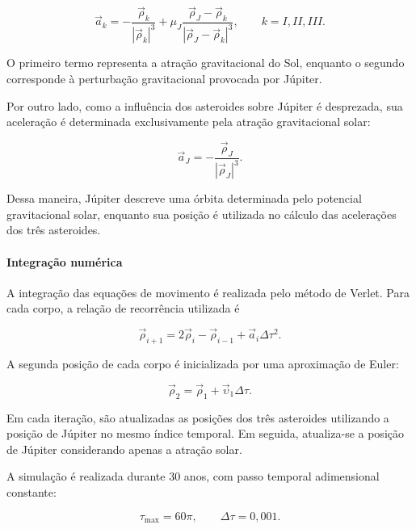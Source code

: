 \documentclass[12pt,a4paper]{article}
\begin{document}
\begin{equation}
    \vec{a}_k=
    -\frac{\vec{\rho}_k}{|\vec{\rho}_k|^3}
    +
    \mu_J
    \frac{\vec{\rho}_J-\vec{\rho}_k}
    {|\vec{\rho}_J-\vec{\rho}_k|^3},
    \qquad k=I,II,III.
\end{equation}

O primeiro termo representa a atração gravitacional do Sol, enquanto o segundo corresponde à perturbação gravitacional provocada por Júpiter.

Por outro lado, como a influência dos asteroides sobre Júpiter é desprezada, sua aceleração é determinada exclusivamente pela atração gravitacional solar:

\begin{equation}
    \vec{a}_J=
    -\frac{\vec{\rho}_J}{|\vec{\rho}_J|^3}.
\end{equation}

Dessa maneira, Júpiter descreve uma órbita determinada pelo potencial gravitacional solar, enquanto sua posição é utilizada no cálculo das acelerações dos três asteroides.

\paragraph{Integração numérica}

A integração das equações de movimento é realizada pelo método de Verlet. Para cada corpo, a relação de recorrência utilizada é

\begin{equation}
    \vec{\rho}_{i+1}
    =
    2\vec{\rho}_i-\vec{\rho}_{i-1}
    +
    \vec{a}_i\Delta\tau^2.
\end{equation}

A segunda posição de cada corpo é inicializada por uma aproximação de Euler:

\begin{equation}
    \vec{\rho}_2=
    \vec{\rho}_1+\vec{\upsilon}_1\Delta\tau.
\end{equation}

Em cada iteração, são atualizadas as posições dos três asteroides utilizando a posição de Júpiter no mesmo índice temporal. Em seguida, atualiza-se a posição de Júpiter considerando apenas a atração solar.

A simulação é realizada durante 30 anos, com passo temporal adimensional constante:

\begin{equation}
    \tau_{\max}=60\pi,
    \qquad
    \Delta\tau=0,001.
\end{equation}
\end{document}
